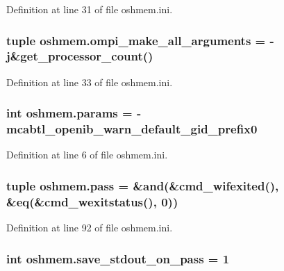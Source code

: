 Definition at line 31 of file oshmem.\-ini.

\hypertarget{namespaceoshmem_a81040e875d1354d954835bd3fb1639d2}{
\subsubsection[{ompi\-\_\-make\-\_\-all\-\_\-arguments}]{\setlength{\rightskip}{0pt plus 5cm}tuple oshmem.\-ompi\-\_\-make\-\_\-all\-\_\-arguments = -\/j\&get\-\_\-processor\-\_\-count()}}\label{namespaceoshmem_a81040e875d1354d954835bd3fb1639d2}


Definition at line 33 of file oshmem.\-ini.

\hypertarget{namespaceoshmem_ab8b5930fba684193f3e00879ebb696b4}{
\subsubsection[{params}]{\setlength{\rightskip}{0pt plus 5cm}int oshmem.\-params = -\/mcabtl\-\_\-openib\-\_\-warn\-\_\-default\-\_\-gid\-\_\-prefix0}}\label{namespaceoshmem_ab8b5930fba684193f3e00879ebb696b4}


Definition at line 6 of file oshmem.\-ini.

\hypertarget{namespaceoshmem_a55c6b6069fadec2aed57554bce164cee}{
\subsubsection[{pass}]{\setlength{\rightskip}{0pt plus 5cm}tuple oshmem.\-pass = \&and(\&cmd\-\_\-wifexited(), \&eq(\&cmd\-\_\-wexitstatus(), 0))}}\label{namespaceoshmem_a55c6b6069fadec2aed57554bce164cee}


Definition at line 92 of file oshmem.\-ini.

\hypertarget{namespaceoshmem_a5141543366545b98e6ec82d73505edf1}{
\subsubsection[{save\-\_\-stdout\-\_\-on\-\_\-pass}]{\setlength{\rightskip}{0pt plus 5cm}int oshmem.\-save\-\_\-stdout\-\_\-on\-\_\-pass = 1}}\label{namespaceoshmem_a5141543366545b98e6ec82d73505edf1}


